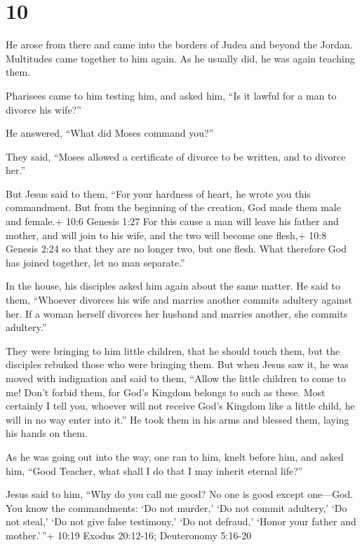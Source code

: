 \hypertarget{section-9}{%
\section{10}\label{section-9}}

 He arose from there and came into the borders of Judea and
beyond the Jordan. Multitudes came together to him again. As he usually
did, he was again teaching them.

 Pharisees came to him testing him, and asked him, ``Is it
lawful for a man to divorce his wife?''

 He answered, ``What did Moses command you?''

 They said, ``Moses allowed a certificate of divorce to be
written, and to divorce her.''

 But Jesus said to them, ``For your hardness of heart, he
wrote you this commandment.  But from the beginning of the
creation, God made them male and female.+ 10:6 Genesis 1:27 
For this cause a man will leave his father and mother, and will join to
his wife,  and the two will become one flesh,+ 10:8 Genesis
2:24 so that they are no longer two, but one flesh.  What
therefore God has joined together, let no man separate.''

 In the house, his disciples asked him again about the same
matter.  He said to them, ``Whoever divorces his wife and
marries another commits adultery against her.  If a woman
herself divorces her husband and marries another, she commits
adultery.''

 They were bringing to him little children, that he should
touch them, but the disciples rebuked those who were bringing them.
 But when Jesus saw it, he was moved with indignation and
said to them, ``Allow the little children to come to me! Don't forbid
them, for God's Kingdom belongs to such as these.  Most
certainly I tell you, whoever will not receive God's Kingdom like a
little child, he will in no way enter into it.''  He took
them in his arms and blessed them, laying his hands on them.

 As he was going out into the way, one ran to him, knelt
before him, and asked him, ``Good Teacher, what shall I do that I may
inherit eternal life?''

 Jesus said to him, ``Why do you call me good? No one is
good except one---God.  You know the commandments: `Do not
murder,' `Do not commit adultery,' `Do not steal,' `Do not give false
testimony,' `Do not defraud,' `Honor your father and mother.'\,''+ 10:19
Exodus 20:12-16; Deuteronomy 5:16-20

